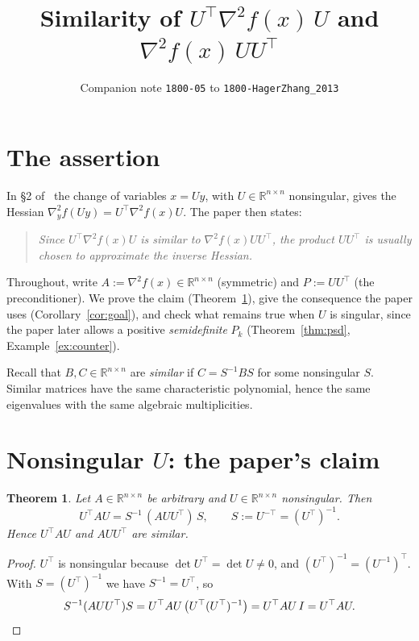 \documentclass[11pt]{article}
\title{Similarity of $U^{\top}\nabla^2 f(x)\,U$ and $\nabla^2 f(x)\,UU^{\top}$}
\author{Companion note \texttt{1800-05} to \texttt{1800-HagerZhang\_2013}}
\date{}
\newtheorem{theorem}{Theorem}
\theoremstyle{remark}
\theoremstyle{definition}
\newcommand{\R}{\mathbb{R}}
\begin{document}
\maketitle

\section{The assertion}

In \S2 of~\cite[p.~2154]{HZ13} the change of variables $x=Uy$, with
$U\in\R^{n\times n}$ nonsingular, gives the Hessian
$\nabla_y^2 f(Uy)=U^{\top}\nabla^2 f(x)U$. The paper then states:
\begin{quote}
\emph{Since $U^{\top}\nabla^2 f(x)U$ is similar to $\nabla^2 f(x)UU^{\top}$,
the product $UU^{\top}$ is usually chosen to approximate the inverse Hessian.}
\end{quote}
Throughout, write $A:=\nabla^2 f(x)\in\R^{n\times n}$ (symmetric) and
$P:=UU^{\top}$ (the preconditioner). We prove the claim (Theorem~\ref{thm:main}),
give the consequence the paper uses (Corollary~\ref{cor:goal}), and check what
remains true when $U$ is singular, since the paper later allows a positive
\emph{semidefinite} $P_k$ (Theorem~\ref{thm:psd}, Example~\ref{ex:counter}).

Recall that $B,C\in\R^{n\times n}$ are \emph{similar} if $C=S^{-1}BS$ for some
nonsingular $S$. Similar matrices have the same characteristic polynomial, hence
the same eigenvalues with the same algebraic multiplicities.

\section{Nonsingular $U$: the paper's claim}

\begin{theorem}\label{thm:main}
Let $A\in\R^{n\times n}$ be arbitrary and $U\in\R^{n\times n}$ nonsingular. Then
\[
U^{\top}AU=S^{-1}\,(AUU^{\top})\,S,\qquad S:=U^{-\top}=(U^{\top})^{-1}.
\]
Hence $U^{\top}AU$ and $AUU^{\top}$ are similar.
\end{theorem}

\begin{proof}
$U^{\top}$ is nonsingular because $\det U^{\top}=\det U\ne0$, and
$(U^{\top})^{-1}=(U^{-1})^{\top}$. With $S=(U^{\top})^{-1}$ we have $S^{-1}=U^{\top}$, so
\[
S^{-1}(AUU^{\top})S=U^{\top}AU\,\bigl(U^{\top}(U^{\top})^{-1}\bigr)=U^{\top}AU\,I=U^{\top}AU .
\qedhere
\]
\end{proof}
\end{document}
